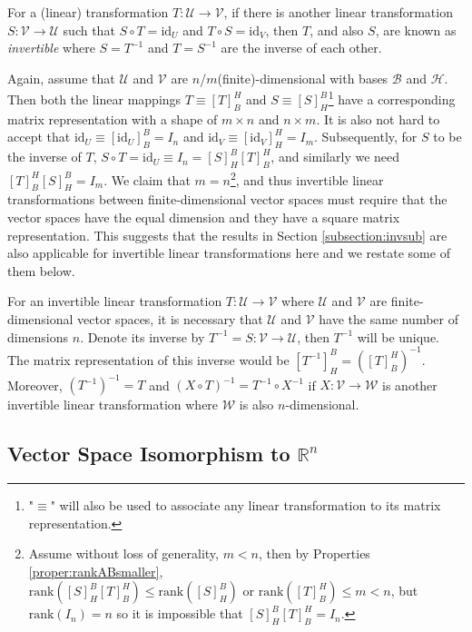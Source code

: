 \begin{defn}
\label{defn:inversetrans}
For a (linear) transformation $T: \mathcal{U} \to \mathcal{V}$, if there is another linear transformation $S: \mathcal{V} \to \mathcal{U}$ such that $S \circ T = \text{id}_{U}$ and $T \circ S = \text{id}_{V}$, then $T$, and also $S$, are known as \textit{invertible} where $S = T^{-1}$ and $T = S^{-1}$ are the inverse of each other.
\end{defn}
Again, assume that $\mathcal{U}$ and $\mathcal{V}$ are $n$/$m$(finite)-dimensional with bases $\mathcal{B}$ and $\mathcal{H}$. Then both the linear mappings $T \equiv [T]_B^H$ and $S \equiv [S]_H^B$\footnote{"$\equiv$" will also be used to associate any linear transformation to its matrix representation.} have a corresponding matrix representation with a shape of $m \times n$ and $n \times m$. It is also not hard to accept that $\text{id}_U \equiv [\text{id}_U]_B^B = I_n$ and $\text{id}_V \equiv [\text{id}_V]_H^H = I_m$. Subsequently, for $S$ to be the inverse of $T$, $S \circ T = \text{id}_U \equiv I_n = [S]_H^B[T]_B^H$, and similarly we need $[T]_B^H[S]_H^B = I_m$. We claim that $m = n$\footnote{Assume without loss of generality, $m < n$, then by Properties \ref{proper:rankABsmaller}, $\text{rank}([S]_H^B[T]_B^H) \leq \text{rank}([S]_H^B) \text{ or } \text{rank}([T]_B^H) \leq m < n$, but $\text{rank}(I_n) = n$ so it is impossible that $[S]_H^B[T]_B^H = I_n$.}, and thus invertible linear transformations between finite-dimensional vector spaces must require that the vector spaces have the equal dimension and they have a square matrix representation. This suggests that the results in Section \ref{subsection:invsub} are also applicable for invertible linear transformations here and we restate some of them below.
\begin{proper}
For an invertible linear transformation $T: \mathcal{U} \to \mathcal{V}$ where $\mathcal{U}$ and $\mathcal{V}$ are finite-dimensional vector spaces, it is necessary that $\mathcal{U}$ and $\mathcal{V}$ have the same number of dimensions $n$. Denote its inverse by $T^{-1} = S: \mathcal{V} \to \mathcal{U}$, then $T^{-1}$ will be unique. The matrix representation of this inverse would be $[T^{-1}]_H^B = ([T]_B^H)^{-1}$. Moreover, $(T^{-1})^{-1} = T$ and $(X \circ T)^{-1} = T^{-1} \circ X^{-1}$ if $X:\mathcal{V} \to \mathcal{W}$ is another invertible linear transformation where $\mathcal{W}$ is also $n$-dimensional.
\end{proper}

\subsection{Vector Space Isomorphism to $\mathbb{R}^n$}

